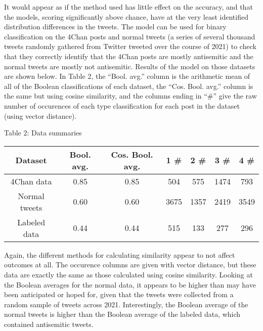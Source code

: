 \documentclass{article}
\begin{document}
It would appear as if the method used has little effect on the accuracy, and that the models, scoring significantly above chance, have at the very least identified distribution differences in the tweets. The model can be used for binary classification on the 4Chan posts and normal tweets (a series of several thousand tweets randomly gathered from Twitter tweeted over the course of 2021) to check that they correctly identify that the 4Chan posts are mostly antisemitic and the normal tweets are mostly not antisemitic. Results of the model on those datasets are shown below. In Table 2, the ``Bool. avg.'' column is the arithmetic mean of all of the Boolean classifications of each dataset, the ``Cos. Bool. avg.'' column is the same but using cosine similarity, and the columns ending in ``\#'' give the raw number of occurences of each type classification for each post in the dataset (using vector distance).
\begin{center}
Table 2: Data summaries\\
\begin{tabular}{ |c|c|c|c|c|c|c|}
\hline {\bf Dataset} & {\bf Bool. avg.} & {\bf Cos. Bool. avg.} & {\bf 1 \#} & {\bf 2 \#} & {\bf 3 \#} & {\bf 4 \#}\\
\hline 
4Chan data & 0.85 & 0.85 & 504 & 575 & 1474 & 793\\
Normal tweets & 0.60 & 0.60 & 3675 & 1357 & 2419 & 3549\\
Labeled data & 0.44 & 0.44 & 515 & 133 & 277 & 296\\
\hline
\end{tabular}
\end{center}

Again, the different methods for calculating similarity appear to not affect outcomes at all. The occurence columns are given with vector distance, but these data are exactly the same as those calculated using cosine similarity. Looking at the Boolean averages for the normal data, it appears to be higher than may have been anticipated or hoped for, given that the tweets were collected from a random sample of tweets across 2021. Interestingly, the Boolean average of the normal tweets is higher than the Boolean average of the labeled data, which contained antisemitic tweets.
\end{document}
